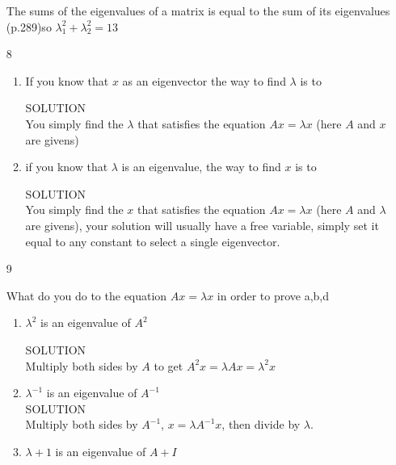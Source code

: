 \documentclass[8pt]{article}
\begin{document}
\begin{enumerate}
The sums of the eigenvalues of a matrix is equal to the sum of its eigenvalues (p.289)so $\lambda_1^2 + \lambda_2^2 = 13$\\






\item[8]

\begin{enumerate}
\item If you know that $x$ as an eigenvector the way to find $\lambda$ is to

SOLUTION\\

You simply find the $\lambda$ that satisfies the equation $Ax = \lambda x$ (here $A$ and $x$ are givens)\\

\item if you know that $\lambda$ is an eigenvalue, the way to find $x$ is to


SOLUTION\\

You simply find the $x$ that satisfies the equation $Ax = \lambda x$ (here $A$ and $\lambda$ are givens), your solution will usually have a free variable, simply set it equal to any constant to select a single eigenvector.\\


\end{enumerate}




\item[9]

What do you do to the equation $Ax = \lambda x$ in order to prove a,b,d

\begin{enumerate}
\item $\lambda^2$ is an eigenvalue of $A^2$

SOLUTION\\

Multiply both sides by $A$ to get $A^2 x = \lambda Ax = \lambda^2 x$


\item $\lambda^{-1}$ is an eigenvalue of $A^{-1}$\\


SOLUTION\\

Multiply both sides by $A^{-1}$, $x = \lambda A^{-1} x$, then divide by $\lambda$.



\item $\lambda + 1 $ is an eigenvalue of $A+I$\\



\end{enumerate}
\end{enumerate}
\end{document}
